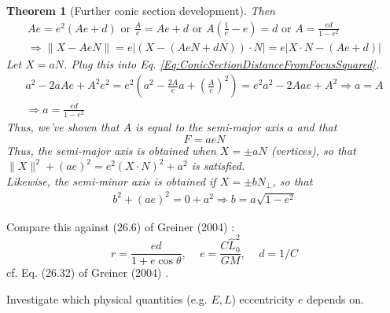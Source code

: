 \documentclass[10pt]{amsart}
\newtheorem{theorem}{Theorem}
\begin{document}
\begin{multicols*}{2}
\begin{theorem}[Further conic section development]
Then
\[
\begin{gathered}
Ae = e^2 ( Ae + d) \text{ or } \frac{A}{e} = Ae + d \text{ or } A \left( \frac{1}{e} - e \right) = d \text{ or } A = \frac{ed}{1 - e^2 } \\
\Longrightarrow \| X - Ae N \| = e| (X - (AeN + dN)) \cdot N | = e|X\cdot N - (Ae + d) |
\end{gathered}
\]
Let $X = aN$. Plug this into Eq. \ref{Eq:ConicSectionDistanceFromFocusSquared}.
\[
\begin{gathered} 
a^2 - 2aA e + A^2 e^2 = e^2 (a^2 - \frac{2A}{e} a + \left( \frac{A}{e} \right)^2 ) = e^2 a^2 - 2Aae + A^2 \Longrightarrow a = A \\
\Longrightarrow a = \frac{ed}{1 - e^2 }
\end{gathered} 
\]
Thus, we've shown that $A$ is equal to the \emph{semi-major axis} $a$ and that 
\begin{equation}
\boxed{ F = aeN }
\end{equation}
Thus, the semi-major axis is obtained when $X = \pm aN$ (vertices), so that $\| X \|^2 + (ae)^2 = e^2 ( X\cdot N)^2 + a^2$ is satisfied. \\
Likewise, the semi-minor axis is obtained if $X = \pm bN_{\perp}$, so that
\begin{equation}\label{Eq:ConicSectionSemiMinorAxis}
\begin{gathered}
	b^2 + (ae)^2 = 0 + a^2 \Longrightarrow \boxed{ b = a \sqrt{ 1 - e^2 } }
\end{gathered} 
\end{equation}

\end{theorem}


Compare this against (26.6) of Greiner (2004) \cite{Grei2004}:
\begin{equation}\label{Eq:ConicSectionPolarCoordinatesFocusCenter}
r = \frac{ed}{ 1 + e\cos{\theta}}, \quad \, e = \frac{C\widehat{L}_0^2}{GM}, \quad \, d = 1/C
\end{equation} cf. Eq. (26.32) of Greiner (2004) \cite{Grei2004}. 

Investigate which physical quantities (e.g. $E, L$) eccentricity $e$ depends on.


\end{multicols*}
\end{document}
